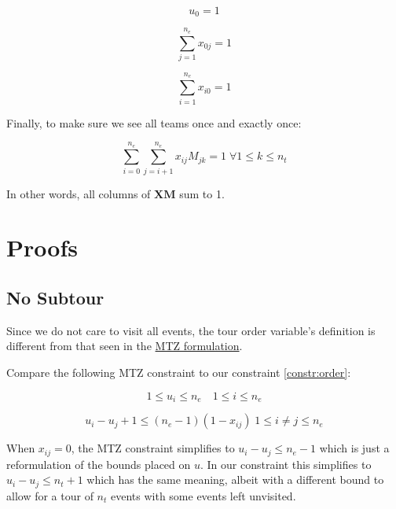 \documentclass[11pt]{article}
\begin{document}
\begin{equation} \label{constr:start}
    u_0 = 1
\end{equation}

\begin{equation} \label{constr:start_out_edge}
    \sum_{j=1}^{n_e} x_{0j} = 1
\end{equation}

\begin{equation} \label{constr:end}
    \sum_{i=1}^{n_e} x_{i0} = 1
\end{equation}

Finally, to make sure we see all teams once and exactly once:

\begin{equation} \label{constr:teams}
    \sum_{i=0}^{n_e} \sum_{j=i + 1}^{n_e} x_{ij}M_{jk}  = 1 \; \forall 1 \leq k \leq n_t
\end{equation}

In other words, all columns of $\mathbf{X} \mathbf{M}$ sum to 1.

\section{Proofs}
\subsection{No Subtour}
Since we do not care to visit all events, the tour order variable's definition is different from that seen in the \href{https://en.wikipedia.org/wiki/Travelling_salesman_problem#Miller%E2%80%93Tucker%E2%80%93Zemlin_formulation}{MTZ formulation}.

Compare the following MTZ constraint to our constraint \eqref{constr:order}:

\begin{equation} \label{constr:mtz_u}
    1 \leq u_i \leq n_e \quad 1 \leq i \leq n_e
\end{equation}

\begin{equation} \label{constr:mtz}
    u_i - u_j + 1 \leq (n_e - 1)(1 - x_{ij}) \; 1 \leq i \neq j \leq n_e
\end{equation}

When $x_{ij} = 0$, the MTZ constraint simplifies to $u_i - u_j \leq n_e - 1$ which is just a reformulation of the bounds placed on $u$. In our constraint this simplifies to $u_i - u_j \leq n_t + 1$ which has the same meaning, albeit with a different bound to allow for a tour of $n_t$ events with some events left unvisited.
\end{document}
